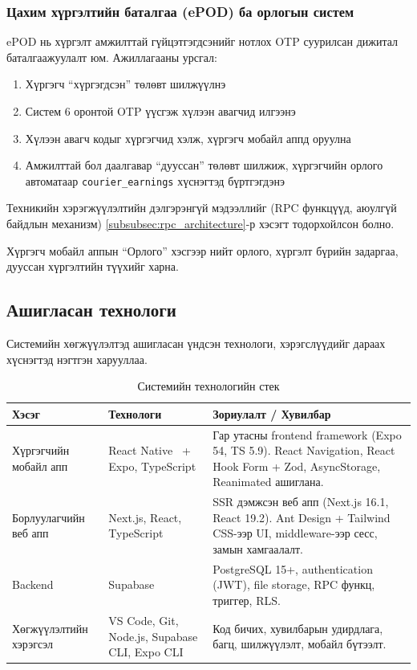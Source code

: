 \subsubsection{Цахим хүргэлтийн баталгаа (ePOD) ба орлогын систем}
\label{subsubsec:epod_system}

ePOD нь хүргэлт амжилттай гүйцэтгэгдсэнийг нотлох OTP суурилсан дижитал баталгаажуулалт юм. Ажиллагааны урсгал:

\begin{enumerate}
  \item Хүргэгч ``хүргэгдсэн'' төлөвт шилжүүлнэ
  \item Систем 6 оронтой OTP үүсгэж хүлээн авагчид илгээнэ
  \item Хүлээн авагч кодыг хүргэгчид хэлж, хүргэгч мобайл аппд оруулна
  \item Амжилттай бол даалгавар ``дууссан'' төлөвт шилжиж, хүргэгчийн орлого автоматаар \texttt{courier\_earnings} хүснэгтэд бүртгэгдэнэ
\end{enumerate}

Техникийн хэрэгжүүлэлтийн дэлгэрэнгүй мэдээллийг (RPC функцүүд, аюулгүй байдлын механизм) \ref{subsubsec:rpc_architecture}-р хэсэгт тодорхойлсон болно.

Хүргэгч мобайл аппын ``Орлого'' хэсгээр нийт орлого, хүргэлт бүрийн задаргаа, дууссан хүргэлтийн түүхийг харна.

\subsection{Ашигласан технологи}
\label{subsec:technology_stack}

Системийн хөгжүүлэлтэд ашигласан үндсэн технологи, хэрэгслүүдийг дараах хүснэгтэд нэгтгэн харууллаа.

\begin{table}[H]
\centering
\renewcommand{\arraystretch}{1.2}
\caption{Системийн технологийн стек}
\footnotesize
\begin{tabular}{|p{3.2cm}|p{3.5cm}|p{7cm}|}
\hline
\textbf{Хэсэг} & \textbf{Технологи} & \textbf{Зориулалт / Хувилбар} \\
\hline
Хүргэгчийн мобайл апп & React Native~\cite{react_native} + Expo, TypeScript & Гар утасны frontend framework (Expo 54, TS 5.9). React Navigation, React Hook Form + Zod, AsyncStorage, Reanimated ашиглана. \\
\hline
Борлуулагчийн веб апп & Next.js, React, TypeScript & SSR дэмжсэн веб апп (Next.js 16.1, React 19.2). Ant Design + Tailwind CSS-ээр UI, middleware-ээр сесс, замын хамгаалалт. \\
\hline
Backend & Supabase & PostgreSQL 15+, authentication (JWT), file storage, RPC функц, триггер, RLS. \\
\hline
Хөгжүүлэлтийн хэрэгсэл & VS Code, Git, Node.js, Supabase CLI, Expo CLI & Код бичих, хувилбарын удирдлага, багц, шилжүүлэлт, мобайл бүтээлт. \\
\hline
\end{tabular}
\end{table}

